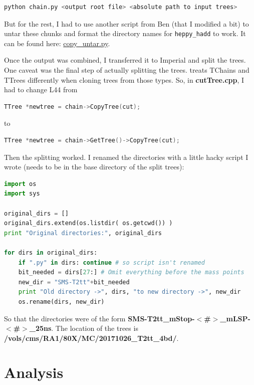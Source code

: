\begin{lstlisting}[belowskip=-0.7cm, language=sh, numbers=none]
python chain.py <output root file> <absolute path to input trees>
\end{lstlisting}

But for the rest, I had to use another script from Ben (that I modified a bit) to untar these chunks and format the directory names for \texttt{heppy\_hadd} to work. It can be found here: \href{run:sec31/copy_untar.py}{copy\_untar.py}.

Once the output was combined, I transferred it to Imperial and split the trees. One caveat was the final step of actually splitting the trees. \ROOT treats TChains and TTrees differently when cloning trees from those types. So, in \textbf{cutTree.cpp}, I had to change L44 from

\begin{lstlisting}[belowskip=-0.7cm, language=C++, numbers=none]
TTree *newtree = chain->CopyTree(cut);
\end{lstlisting}

to

\begin{lstlisting}[belowskip=-0.7cm, language=C++, numbers=none]
TTree *newtree = chain->GetTree()->CopyTree(cut);
\end{lstlisting}

Then the splitting worked. I renamed the directories with a little hacky script I wrote (needs to be in the base directory of the split trees):

\begin{lstlisting}[belowskip=-0.7cm, language=python, numbers=none]
import os
import sys

original_dirs = []
original_dirs.extend(os.listdir( os.getcwd()) )
print "Original directories:", original_dirs

for dirs in original_dirs:
    if ".py" in dirs: continue # so script isn't renamed
    bit_needed = dirs[27:] # Omit everything before the mass points
    new_dir = "SMS-T2tt"+bit_needed
    print "Old directory ->", dirs, "to new directory ->", new_dir
    os.rename(dirs, new_dir)
\end{lstlisting}

So that the directories were of the form \textbf{SMS-T2tt\_mStop-$<$\#$>$\_mLSP-$<$\#$>$\_25ns}. The location of the trees is \textbf{/vols/cms/RA1/80X/MC/20171026\_T2tt\_4bd/}.


\section{Analysis}

